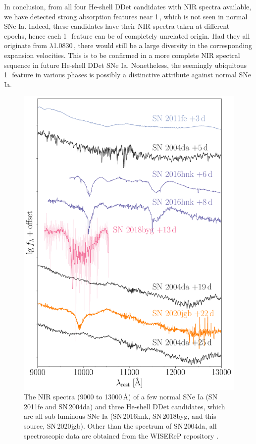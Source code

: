 \documentclass[twocolumn]{aastex631}
\newcommand{\sn}{SN\,2020jgb}
\begin{document}
In conclusion, from all four He-shell DDet candidates with NIR spectra available, we have detected strong absorption features near 1\,\micron, which is not seen in normal SNe Ia. Indeed, these candidates have their NIR spectra taken at different epochs, hence each 1\,\micron\ feature can be of completely unrelated origin. Had they all originate from  $\lambda$1.0830\,\micron, there would still be a large diversity in the corresponding expansion velocities. This is to be confirmed in a more complete NIR spectral sequence in future He-shell DDet SNe Ia. Nonetheless, the seemingly ubiquitous 1\,\micron\ feature in various phases is possibly a distinctive attribute against normal SNe Ia.

\begin{figure}
    \centering
    \includegraphics[width=\linewidth]{NIR_spec_comp.pdf}
    \caption{The NIR spectra (9000 to 13000\,\r{A}) of a few normal SNe Ia (SN\,2011fe and SN\,2004da) and three He-shell DDet candidates, which are all sub-luminous SNe Ia (SN\,2016hnk, SN\,2018byg, and this source, \sn). Other than the spectrum of SN\,2004da, all spectroscopic data are obtained from the WISEReP repository \citep{wiserep_2012}.}
    \label{fig:NIR_comp}
\end{figure}
\end{document}
